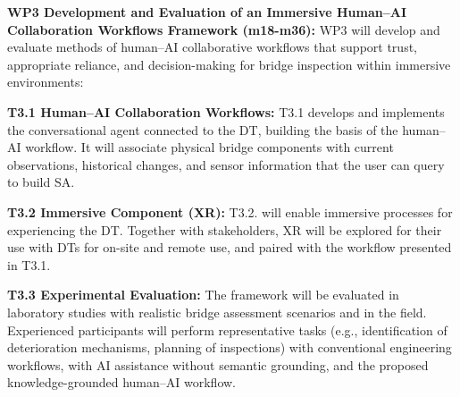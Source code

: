\documentclass[12pt,a4paper]{article}
\begin{document}
\textbf{WP3 Development and Evaluation of an Immersive Human–AI Collaboration Workflows Framework (m18-m36):} WP3 will develop and evaluate methods of human–AI collaborative workflows that support trust, appropriate reliance, and decision-making for bridge inspection within immersive environments:\par \vspace{-0.3cm}
%
\textbf{T3.1 Human–AI Collaboration Workflows: }T3.1 develops and implements the conversational agent connected to the DT, building the basis of the human–AI workflow. It will associate physical bridge components with current observations, historical changes, and sensor information that the user can query to build SA.\textbf{ }\par \vspace{-0.3cm}
\textbf{T3.2 Immersive Component (XR): }T3.2. will enable immersive processes for experiencing the DT. Together with stakeholders, XR will be explored for their use with DTs for on-site and remote use, and paired with the workflow presented in T3.1. \par \vspace{-0.3cm}
\textbf{T3.3 Experimental Evaluation: }The framework will be evaluated in laboratory studies with realistic bridge assessment scenarios and in the field. Experienced participants will perform representative tasks (e.g., identification of deterioration mechanisms, planning of inspections) with conventional engineering workflows, with AI assistance without semantic grounding, and the proposed knowledge-grounded human–AI workflow. \par %


\end{document}
